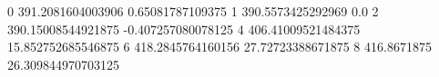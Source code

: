 0 391.2081604003906 0.65081787109375
1 390.5573425292969 0.0
2 390.15008544921875 -0.407257080078125
4 406.41009521484375 15.852752685546875
6 418.2845764160156 27.72723388671875
8 416.8671875 26.309844970703125
